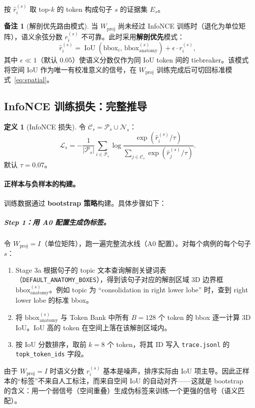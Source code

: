 \documentclass[11pt,a4paper]{article}
\newcommand{\IoU}{\operatorname{IoU}}
\theoremstyle{definition}
\newtheorem{definition}{定义}[section]
\newtheorem{remark}{备注}[section]
\begin{document}
按 $\hat{r}_i^{(s)}$ 取 top-$k$ 的 token 构成句子 $s$ 的证据集 $E_s$。

\begin{remark}[解剖优先路由模式]\label{rmk:anat_primary}
当 $W_{\mathrm{proj}}$ 尚未经过 InfoNCE 训练时（退化为单位矩阵），语义余弦分数 $r_i^{(s)}$ 不可靠。此时采用\textbf{解剖优先}模式：
\begin{equation}\label{eq:anat_primary}
\hat{r}_i^{(s)} = \IoU(\mathrm{bbox}_i,\, \mathrm{bbox}_{\mathrm{anatomy}}^{(s)}) + \epsilon \cdot r_i^{(s)},
\end{equation}
其中 $\epsilon \ll 1$（默认 $0.05$）使语义分数仅作为同 IoU token 间的 tiebreaker。该模式将空间 IoU 作为唯一有校准意义的信号，在 $W_{\mathrm{proj}}$ 训练完成后可切回标准模式~\eqref{eq:spatial}。
\end{remark}


\subsection{InfoNCE 训练损失：完整推导}

\begin{definition}[InfoNCE 损失]
令 $\mathcal{C}_s = \mathcal{P}_s \cup \mathcal{N}_s$：
\begin{equation}\label{eq:infonce}
\mathcal{L}_s = -\frac{1}{|\mathcal{P}_s|} \sum_{i \in \mathcal{P}_s}
\log \frac{\exp(\hat{r}_i^{(s)}/\tau)}
     {\sum_{j \in \mathcal{C}_s} \exp(\hat{r}_j^{(s)}/\tau)}.
\end{equation}
默认 $\tau = 0.07$。
\end{definition}

\paragraph{正样本与负样本的构建。}

训练数据通过 \textbf{bootstrap 策略}构建。具体步骤如下：

\subparagraph{Step 1：用 A0 配置生成伪标签。}
令 $W_{\mathrm{proj}} = I$（单位矩阵），跑一遍完整流水线（A0 配置）。对每个病例的每个句子 $s$：
\begin{enumerate}[nosep]
    \item Stage 3a 根据句子的 topic 文本查询解剖关键词表（\texttt{DEFAULT\_ANATOMY\_BOXES}），得到该句子对应的解剖区域 3D 边界框 $\mathrm{bbox}_{\mathrm{anatomy}}^{(s)}$。例如 topic 为 ``consolidation in right lower lobe'' 时，查到 right lower lobe 的标准 bbox。
    \item 将 $\mathrm{bbox}_{\mathrm{anatomy}}^{(s)}$ 与 Token Bank 中所有 $B=128$ 个 token 的 bbox 逐一计算 3D IoU。IoU 高的 token 在空间上落在该解剖区域内。
    \item 按 IoU 分数排序，取前 $k=8$ 个 token，将其 ID 写入 \texttt{trace.jsonl} 的 \texttt{topk\_token\_ids} 字段。
\end{enumerate}
由于 $W_{\mathrm{proj}} = I$ 时语义分数 $r_i^{(s)}$ 基本是噪声，排序实际由 IoU 项主导。因此正样本的``标签''不来自人工标注，而来自空间 IoU 的自动对齐——这就是 bootstrap 的含义：用一个弱信号（空间重叠）生成伪标签来训练一个更强的信号（语义匹配）。
\end{document}
